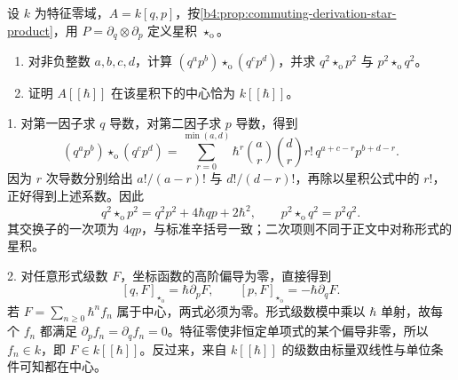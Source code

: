 \begin{optionalexercise}\label{b4:ex:ordered-star-polynomials}
	设 \(k\) 为特征零域，\(A=k[q,p]\)，按\cref{b4:prop:commuting-derivation-star-product}，用 \(P=\partial_q\otimes\partial_p\) 定义星积 \(\star_{\mathrm o}\)。
	\begin{enumerate}
		\item 对非负整数 \(a,b,c,d\)，计算 \((q^ap^b)\star_{\mathrm o}(q^cp^d)\)，并求 \(q^2\star_{\mathrm o}p^2\) 与 \(p^2\star_{\mathrm o}q^2\)。
		\item 证明 \(A[\![\hbar]\!]\) 在该星积下的中心恰为 \(k[\![\hbar]\!]\)。
	\end{enumerate}
\end{optionalexercise}
\begin{solution}
	1. 对第一因子求 \(q\) 导数，对第二因子求 \(p\) 导数，得到
	\[
		(q^ap^b)\star_{\mathrm o}(q^cp^d)
		=\sum_{r=0}^{\min(a,d)}
		\hbar^r\binom ar\binom dr r!\,
		q^{a+c-r}p^{b+d-r}.
	\]
	因为 \(r\) 次导数分别给出 \(a!/(a-r)!\) 与 \(d!/(d-r)!\)，再除以星积公式中的 \(r!\)，正好得到上述系数。因此
	\[
		q^2\star_{\mathrm o}p^2=q^2p^2+4\hbar qp+2\hbar^2,
		\qquad p^2\star_{\mathrm o}q^2=p^2q^2.
	\]
	其交换子的一次项为 \(4qp\)，与标准辛括号一致；二次项则不同于正文中对称形式的星积。

	2. 对任意形式级数 \(F\)，坐标函数的高阶偏导为零，直接得到
	\[
		[q,F]_{\star_{\mathrm o}}=\hbar\partial_pF,
		\qquad [p,F]_{\star_{\mathrm o}}=-\hbar\partial_qF.
	\]
	若 \(F=\sum_{n\ge0}\hbar^nf_n\) 属于中心，两式必须为零。形式级数模中乘以 \(\hbar\) 单射，故每个 \(f_n\) 都满足 \(\partial_pf_n=\partial_qf_n=0\)。特征零使非恒定单项式的某个偏导非零，所以 \(f_n\in k\)，即 \(F\in k[\![\hbar]\!]\)。反过来，来自 \(k[\![\hbar]\!]\) 的级数由标量双线性与单位条件可知都在中心。
\end{solution}

